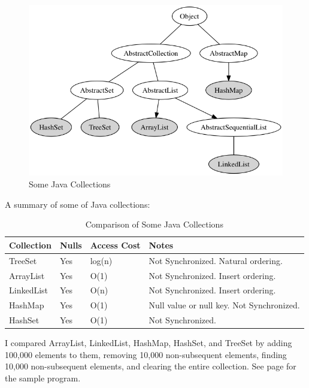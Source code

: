 \begin{figure}[H]\centering
\includegraphics[width=\linewidth]{collections.png}
\caption{Some Java Collections}
\label{fig:collections}
\end{figure}
A summary of some of Java collections:
\begin{table}[!htb]
\centering
\begin{tabulary}{\columnwidth}{ |>{\raggedright\arraybackslash} p{0.2\columnwidth} | >{\raggedright\arraybackslash}p{0.1\columnwidth} | >{\raggedright\arraybackslash}p{0.1\columnwidth} | >{\raggedright\arraybackslash}p{0.4\columnwidth}|}
\hline
\textbf{Collection} & \textbf{Nulls} & \textbf{Access Cost}& \textbf{Notes} \\ \hline 
TreeSet  & Yes  & log(n) & Not Synchronized. Natural ordering. \\ \hline 
ArrayList  & Yes &   O(1) & Not Synchronized. Insert ordering.\\ \hline 
LinkedList  & Yes &  O(n) & Not Synchronized. Insert ordering.\\ \hline 
HashMap  & Yes & O(1) & Null value or null key. Not Synchronized. \\ \hline 
HashSet  & Yes & O(1) & Not Synchronized.  \\ \hline 
\end{tabulary}
\caption{Comparison of Some Java Collections}\label{tab:collections}
\end{table}

I compared ArrayList, LinkedList, HashMap, HashSet, and TreeSet by adding 100,000 elements to them, removing 10,000 non-subsequent elements, finding 10,000 non-subsequent elements, and clearing the entire collection. See page \pageref{App:AppendixE} for the sample program.

